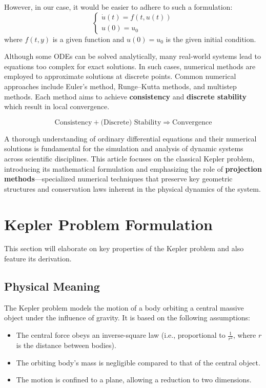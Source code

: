 \documentclass[11pt]{article}
\begin{document}
However, in our case, it would be easier to adhere to such a formulation:
\[
\begin{cases}
    \dot u(t) = f(t, u(t)) \\
    u(0) = u_0
\end{cases}
\]
where $ f(t,y) $ is a given function and $u(0) = u_0$ is the given initial condition. 

Although some ODEs can be solved analytically, many real-world systems lead to equations too complex for exact solutions. In such cases, numerical methods are employed to approximate solutions at discrete points. Common numerical approaches include Euler's method, Runge–Kutta methods, and multistep methods. Each method aims to achieve \textbf{consistency} and \textbf{discrete stability} which result in local convergence.

\[
\text{Consistency} + \text{(Discrete) Stability} \Rightarrow \text{Convergence}
\]

A thorough understanding of ordinary differential equations and their numerical solutions is fundamental for the simulation and analysis of dynamic systems across scientific disciplines. This article focuses on the classical Kepler problem, introducing its mathematical formulation and emphasizing the role of \textbf{projection methods}—specialized numerical techniques that preserve key geometric structures and conservation laws inherent in the physical dynamics of the system.

\clearpage

\section{Kepler Problem Formulation}
This section will elaborate on key properties of the Kepler problem and also feature its derivation.

\subsection{Physical Meaning}
The Kepler problem models the motion of a body orbiting a central massive object under the influence of gravity. It is based on the following assumptions:
\begin{itemize}
    \item The central force obeys an inverse-square law (i.e., proportional to $\frac{1}{r^2}$, where $r$ is the distance between bodies).
    \item The orbiting body’s mass is negligible compared to that of the central object.
    \item The motion is confined to a plane, allowing a reduction to two dimensions.
\end{itemize}
\end{document}
